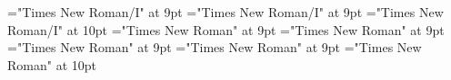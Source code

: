 \documentclass[gps1,twoside]{article}
\begin{document}
\font\translationtranslationspanexampleexampleexamplessensesensessensesensessubentrysubentriesentryexamplespansensespanspansubentrysubentriesentrysubentriesdiventryletData="Times New Roman/I" at 9pt
\font\translationaftertranslationspanexampleexampleexamplessensesensessensesensessubentrysubentriesentryexamplespansensespanspansubentrysubentriesentrysubentriesdiventryletData="Times New Roman/I" at 9pt
\font\spanentranslationtranslationspanexampleexampleexamplessensesensessensesensessubentrysubentriesentryexamplespansensespanspansubentrysubentriesentrysubentriesdiventryletData="Times New Roman/I" at 10pt
\font\semanticdomainssensesensesentrybeforesensespanspansubentrysubentriesentrysubentriesdiventryletData="Times New Roman" at 9pt
\font\semanticdomainssensesensesentryaftersensespanspansubentrysubentriesentrysubentriesdiventryletData="Times New Roman" at 9pt
\font\spanspansensespanspansubentrysubentriesentrysubentriesdiventryletData="Times New Roman" at 9pt
\font\spanspanspansensespanspansubentrysubentriesentrysubentriesdiventryletData="Times New Roman" at 9pt
\font\spanenspanspanspansensespanspansubentrysubentriesentrysubentriesdiventryletData="Times New Roman" at 10pt
\end{document}
